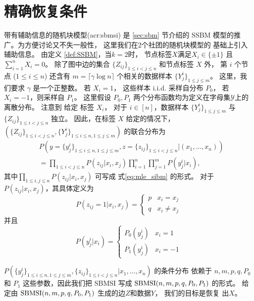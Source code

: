 \section{精确恢复条件}\label{sec:sbmsi_exact_recovery_condition}
带有辅助信息的随机块模型(\gls{acr:sbmsi})
是 \ref{sec:sbm} 节介绍的
SSBM 模型的推广。为方便讨论又不失一般性，
这里我们在2个社团的随机块模型的
基础上引入辅助信息。
由定义 \ref{def:SSBM}，当$k=2$时，
节点标签$X$满足$X_i \in \{\pm 1\}$
且 $\sum_{i=1}^n X_i = 0$。
除了图中边的集合
$\{Z_{ij}\}_{1\le i<j\le n}$
和节点标签 $X$ 外，
第 $i$  个节点 ($1\leq i \leq n$) 
还含有 $m=\lceil \gamma \log n \rceil $ 个相关的数据样本 
$\{Y^{i}_j\}_{1\leq j \leq m}$。
这里，我们要求 $\gamma$ 是一个正整数。
若 $X_i=1$，
这些样本 i.i.d. 采样自分布 $P_0$，
若 $X_i=-1$，则采样自 $P_1$。
这里假设 $P_0, P_1$ 两个分布函数均为定义在字母集$\mathcal{Y}$上的离散分布。
注意到 给定 标签 $X_i$，
对于 $i\in [n]$，数据样本 $\{Y^{i}_j\}_{1\leq j \leq m}$ 与 $\{Z_{ij}\}_{1\le i<j\le n}$ 独立。
因此，在标签 $X$ 给定的情况下，
  $(\{Z_{ij}\}_{1\le i<j\le n},\{Y^i_{j}\}_{1\le i\le n,1\le j\le m})$ 的联合分布为  
\begin{align}\label{eq:lh}
    &P\left(y=\{y^i_{j}\}_{1\le i\le n,1\le j\le m},z=\{z_{ij}\}_{1\le i<j\le n}| (x_1,\ldots,x_n) \right) \nonumber\\
    &= \prod_{1\le i < j\le n}P(z_{ij}|x_i,x_j)\prod_{i=1}^n \prod_{j=1}^m P(y^i_j|x_i), 
\end{align}
其中$\prod_{1\le i,j\le n}P(z_{ij}|x_i,x_j)$ 可写成
式\eqref{eq:mle_sibm} 的形式。
对于$P(z_{ij}|x_i,x_j)$，其具体定义为
\begin{equation*}
    P  (z_{ij}=1|x_i,x_j) = \begin{cases}
        p &   x_i = x_j \\
        q &   x_i\ne x_j
    \end{cases}
\end{equation*}
并且
\begin{equation*}
    P(y^i_j|x_i) = \begin{cases}
        P_0(y^i_j) & x_i = 1 \\
        P_1(y^i_j) & x_i = -1
    \end{cases}
\end{equation*}

 $P(\{y^i_{j}\}_{1\le i\le n,1\le j\le m},\{z_{ij}\}_{1\le i<j\le n}| x_1,\ldots,x_n)$ 
 的条件分布 依赖于
 $n,m,p, q, P_0$ 和 $P_1$ 这些参数，因此我们把 SBMSI 写成 $\operatorname{SBMSI}(n,m,p,q,P_0,P_1)$ 的形式。
 给定由 $\operatorname{SBMSI}(n,m,p,q,P_0,P_1)$ 生成的边$Z$和数据$Y$， 我们的目标是恢复 出$X$。
 
